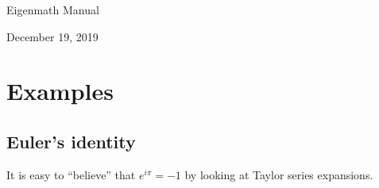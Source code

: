 \documentclass[11pt]{article}
\begin{document}
\begin{center}
{\LARGE Eigenmath Manual}

December 19, 2019
\end{center}

\tableofcontents

\newpage




































\section{Examples}















\subsection{Euler's identity}
It is easy to ``believe'' that $e^{i\pi}=-1$ by looking at Taylor series expansions.
\end{document}
